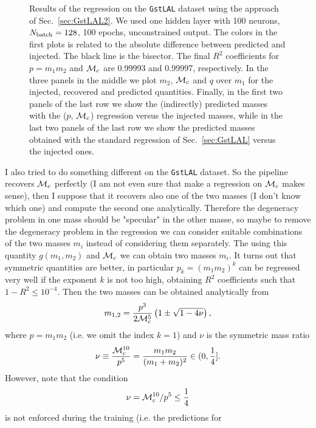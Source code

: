 \documentclass[prd,aps,twocolumn,a4paper,showkeys,nofootinbib]{revtex4-1}
\def\Mc{{\cal M}_c}
\begin{document}
\begin{figure}[]
  \caption{\label{fig:GstLAL2_results} Results of the regression on the \texttt{GstLAL}
  dataset using the approach of Sec.~\ref{sec:GstLAL2}. 
  We used one hidden layer with 100 neurons, $N_{\rm batch}=128$, 100 epochs,  
  unconstrained output.
  The colors in the first plots is related to the absolute difference between predicted 
  and injected. The black line is the bisector.
  The final $R^2$ coefficients for $p=m_1 m_2$ and $\Mc$ are 0.99993 and 0.99997,
  respectively.
  In the three panels in the middle we plot $m_2$, $\Mc$ and $q$ over $m_1$ for 
  the injected, recovered and predicted quantities.
  Finally, in the first two panels of the last row we show the (indirectly) predicted masses 
  with the ($p$, $\Mc$) regression versus the injected masses, 
  while in the last two panels of the last row we show the 
  predicted masses obtained with the standard regression of Sec.~\ref{sec:GstLAL} versus 
  the injected ones.}
\end{figure}
%
I also tried to do something different on the \texttt{GstLAL} dataset. 
So the pipeline recovers $\Mc$ perfectly (I am not even sure that make a regression on $\Mc$
makes sense), then I suppose that it recovers also one of the two masses 
(I don't know which one) and compute the second one analytically. Therefore the degeneracy problem
in one mass should be "specular" in the other masse, so maybe to remove the degeneracy problem
in the regression we can consider suitable combinations of the two masses $m_i$ instead of 
considering them separately. The using this quantity $g(m_1,m_2)$ and $\Mc$ we can obtain 
two masses $m_i$. It turns out that symmetric quantities are better, in particular 
$p_k= (m_1 m_2)^k$ can be regressed very well if the exponent $k$ is not too high, 
obtaining $R^2$ coefficients such that $1-R^2 \leq 10^{-4}$. Then the two masses can be
obtained analytically from
\begin{equation}
\label{eq:m12frompMc}
m_{1,2} = \frac{p^3}{2 \Mc^5}\left( 1 \pm \sqrt{1-4\nu} \right),
\end{equation}
where $p=m_1 m_2$ (i.e. we omit the index $k=1$) and $\nu$ is the symmetric mass ratio
\begin{equation}
\nu \equiv \frac{\Mc^{10}}{p^5} = \frac{m_1 m_2}{(m_1+m_2)^2}\in (0, \frac{1}{4}].
\end{equation}
However, note that the condition
\begin{equation}
\label{eq:nu_condition}
\nu=\Mc^{10}/p^5\leq \frac{1}{4}
\end{equation} 
is not enforced during the training (i.e. the predictions for 
\end{document}
